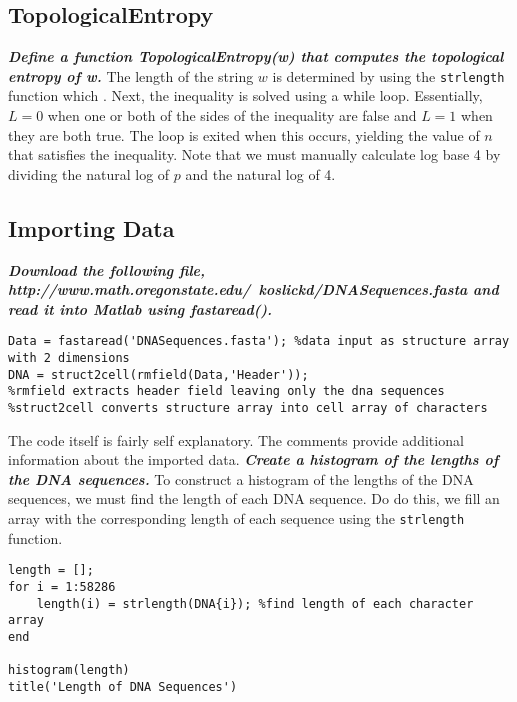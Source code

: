 \documentclass{article}
\begin{document}
\subsection{TopologicalEntropy}
\textbf{\textit{Define a function TopologicalEntropy(w) that computes the topological entropy of w.}}
\newline
\newline
The length of the string $w$ is determined by using the \texttt{strlength} function which \cite{4}.
Next, the inequality is solved using a while loop.
Essentially, $L = 0$ when one or both of the sides of the inequality are false and $L = 1$ when they are both true.
The loop is exited when this occurs, yielding the value of $n$ that satisfies the inequality.
Note that we must manually calculate log base 4 by dividing the natural log of $p$ and the natural log of 4.
\newline


\subsection{Importing Data}
\textbf{\textit{Download the following file, http://www.math.oregonstate.edu/~koslickd/DNASequences.fasta and read it into Matlab using fastaread().}}
\newline
\begin{lstlisting}
Data = fastaread('DNASequences.fasta'); %data input as structure array with 2 dimensions
DNA = struct2cell(rmfield(Data,'Header'));
%rmfield extracts header field leaving only the dna sequences
%struct2cell converts structure array into cell array of characters
\end{lstlisting}
\noindent The code itself is fairly self explanatory.
The comments provide additional information about the imported data.
\newline
\newline
\newline
\textbf{\textit{Create a histogram of the lengths of the DNA sequences.}}
\newline
\newline
To construct a histogram of the lengths of the DNA sequences, we must find the length of each DNA sequence.
Do do this, we fill an array with the corresponding length of each sequence using the \texttt{strlength} function.
\newline
\begin{lstlisting}
length = [];
for i = 1:58286
    length(i) = strlength(DNA{i}); %find length of each character array
end

histogram(length)
title('Length of DNA Sequences')
\end{lstlisting}
\end{document}
